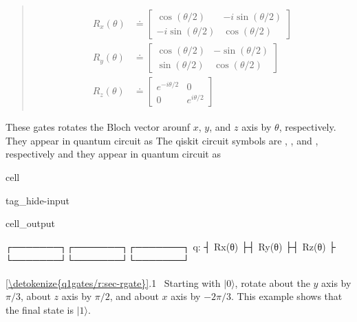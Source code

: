 \documentclass[letterpaper,10pt,english]{jupyterBook}
\begin{document}
\sphinxAtStartPar
{}
\begin{quote}
\begin{equation*}
\begin{split}
\begin{align}
R_x(\theta) &\doteq \begin{bmatrix} \cos(\theta/2) & -i \sin(\theta/2) \\ -i \sin(\theta/2)& \cos(\theta/2)\end{bmatrix} \\
R_y(\theta) &\doteq \begin{bmatrix} \cos(\theta/2) & - \sin(\theta/2) \\ \sin(\theta/2)& \cos(\theta/2)\end{bmatrix}\\
R_z(\theta) &\doteq \begin{bmatrix} e^{-i \theta/2} & 0 \\0 & e^{i \theta/2}\end{bmatrix}
\end{align}
\end{split}
\end{equation*}\end{quote}

\sphinxAtStartPar
These gates rotates the Bloch vector arounf \(x\), \(y\), and \(z\) axis by \(\theta\), respectively. They appear in quantum circuit as
The qiskit circuit symbols are , , and , respectively and they appear in quantum circuit as

\begin{sphinxuseclass}{cell}
\begin{sphinxuseclass}{tag_hide-input}\begin{sphinxVerbatimOutput}

\begin{sphinxuseclass}{cell_output}
\begin{sphinxVerbatim}[commandchars=\\\{\}]
   ┌───────┐┌───────┐┌───────┐
q: ┤ Rx(θ) ├┤ Ry(θ) ├┤ Rz(θ) ├
   └───────┘└───────┘└───────┘
\end{sphinxVerbatim}

\end{sphinxuseclass}\end{sphinxVerbatimOutput}

\end{sphinxuseclass}
\end{sphinxuseclass}
\sphinxAtStartPar
{} \hyperref[\detokenize{q1gates/r:sec-rgate}]{\ref{\detokenize{q1gates/r:sec-rgate}}}.1   Starting with \(|0\rangle\), rotate about the \(y\) axis by \(\pi/3\), about \(z\) axis by \(\pi/2\), and about \(x\) axis by \(-2\pi/3\). This example shows that the final state is \(|1\rangle\).
\end{document}
